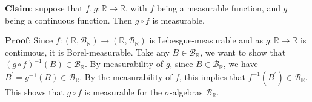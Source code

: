 \documentclass[12pt,a4paper]{ctexart}
\begin{document}
$\textbf{Claim:}$ suppose that $f, g: \mathbb{R} \rightarrow \mathbb{R}$, with $f$ being a measurable function, and $g$ being a continuous function. Then $g \circ f$ is measurable.

$\textbf{Proof:}$ Since $f: (\mathbb{R}, \mathcal{B}_{\mathbb{R}}) \rightarrow (\mathbb{R}, \mathcal{B}_{\mathbb{R}})$ is Lebesgue-measurable and as $g: \mathbb{R} \rightarrow \mathbb{R}$ is continuous, it is Borel-measurable. Take any $B \in \mathcal{B}_{\mathbb{R}}$, we want to show that $(g \circ f)^{-1}(B) \in \mathcal{B}_{\mathbb{R}}$. By measurability of $g$, since $B \in \mathcal{B}_{\mathbb{R}}$, we have $B^{'} = g^{-1}(B) \in \mathcal{B}_{\mathbb{R}}$. By the measurability of $f$, this implies that $f^{-1}(B^{'}) \in \mathcal{B}_{\mathbb{R}}$. This shows that $g \circ f$ is measurable for the $\sigma$-algebras $\mathcal{B}_{\mathbb{R}}$.













 
\end{document}

